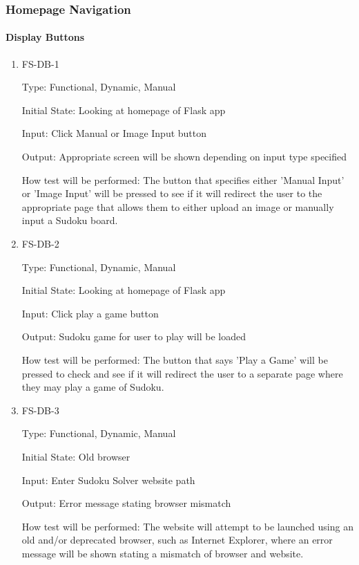 \documentclass[11pt]{article}
\begin{document}
\subsubsection{Homepage Navigation}
		
\paragraph{Display Buttons}

\begin{enumerate}

\item{FS-DB-1\\}

Type: Functional, Dynamic, Manual
					
Initial State: Looking at homepage of Flask app
					
Input: Click Manual or Image Input button
					
Output: Appropriate screen will be shown depending on input type specified
					
How test will be performed: The button that specifies either 'Manual Input' or 'Image Input' will be pressed to see if it will redirect the user to the appropriate page that allows them to either upload an image or manually input a Sudoku board.
					
\item{FS-DB-2\\}

Type: Functional, Dynamic, Manual
					
Initial State: Looking at homepage of Flask app
					
Input: Click play a game button
					
Output: Sudoku game for user to play will be loaded
					
How test will be performed: The button that says 'Play a Game' will be pressed to check and see if it will redirect the user to a separate page where they may play a game of Sudoku.

\item{FS-DB-3\\}

Type: Functional, Dynamic, Manual
					
Initial State: Old browser
					
Input: Enter Sudoku Solver website path
					
Output: Error message stating browser mismatch
					
How test will be performed: The website will attempt to be launched using an old and/or deprecated browser, such as Internet Explorer, where an error message will be shown stating a mismatch of browser and website.

\end{enumerate}
\end{document}
